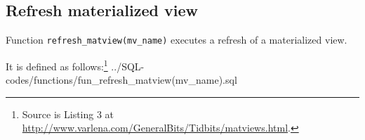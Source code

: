 \subsection{Refresh materialized view}\label{subsec_fun_refresh_matview}

Function \texttt{refresh\_matview(mv\_name)} executes a refresh of a materialized view.

It is defined as follows:\footnote{Source is Listing 3 at \url{http://www.varlena.com/GeneralBits/Tidbits/matviews.html}.} 
%
{../SQL-codes/functions/fun_refresh_matview(mv_name).sql}
